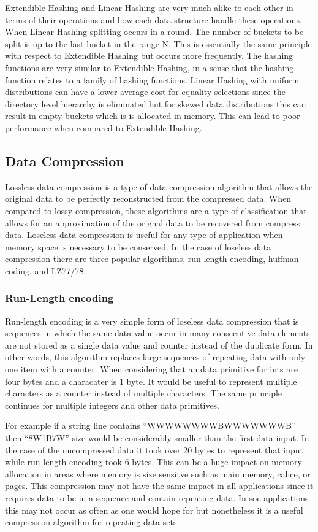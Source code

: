 \documentclass[letterpaper, 12pt]{article}
\begin{document}
Extendible Hashing and Linear Hashing are very much alike to each other in terms of their operations and 
how each data structure handle these operations. When Linear Hashing splitting occurs in a round. The 
number of buckets to be split is up to the last bucket in the range N. This is essentially the same 
principle with respect to Extendible Hashing but occurs more frequently. The hashing functions are 
very similar to Extendible Hashing, in a sense that the hashing function relates to a family of 
hashing functions. Linear Hashing with uniform distributions can have a lower average cost for 
equality selections since the directory level hierarchy is eliminated but for skewed data 
distributions this can result in empty buckets which is is allocated in memory. This can lead 
to poor performance when compared to Extendible Hashing.

\subsection{Data Compression}
Lossless data compression is a type of data compression algorithm that allows
the original data to be perfectly reconstructed from the compressed data. When
compared to lossy compression, these algorithms are a type of classification that
allows for an approximation of the orignal data to be recovered from compress data.
Loseless data compression is useful for any type of application when memory space is
necessary to be conserved. In the case of loseless data compression there are three
popular algorithms, run-length encoding, huffman coding, and LZ77/78.
\par\vspace{\baselineskip}
\subsubsection{Run-Length encoding}
Run-length encoding is a very simple form of loseless data compression that is sequences
in which the same data value occur in many consecutive data elements are not stored as a
single data value and counter instead of the duplicate form. In other words, this algorithm
replaces large sequences of repeating data with only one item with a counter. When considering
that an data primitive for ints are four bytes and a characater is 1 byte. It would be useful
to represent multiple characters as a counter instead of multiple characters. The same principle
continues for multiple integers and other data primitives.
\par\vspace{\baselineskip}
For example if a string line contains ``WWWWWWWWBWWWWWWWB'' then ``8W1B7W'' size would be considerably
smaller than the first data input. In the case of the uncompressed data it took over 20 bytes to
represent that input while run-length encoding took 6 bytes. This can be a huge impact on memory
allocation in areas where memory is size sensitve such as main memory, cahce, or pages.
This compression may not have the same impact in all applications since it requires data to be
in a sequence and contain repeating data. In soe applications this may not occur as often as one would
hope for but nonetheless it is a useful compression algorithm for repeating data sets.
\end{document}
